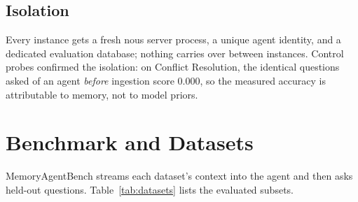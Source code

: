 \documentclass{article}
\newcommand{\nous}{\textsf{nous}}
\newcommand{\mab}{MemoryAgentBench}
\begin{document}
\subsection{Isolation}
Every instance gets a fresh \nous{} server process, a unique agent identity,
and a dedicated evaluation database; nothing carries over between instances.
Control probes confirmed the isolation: on Conflict Resolution, the identical
questions asked of an agent \emph{before} ingestion score 0.000, so the
measured accuracy is attributable to memory, not to model priors.

\section{Benchmark and Datasets}

\mab{} streams each dataset's context into the agent and then asks held-out
questions. Table~\ref{tab:datasets} lists the evaluated subsets.
\end{document}
